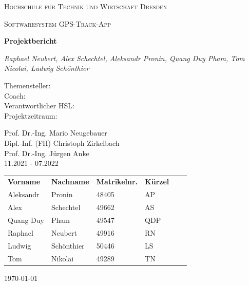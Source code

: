 \documentclass[10pt]{article}
\begin{document}
\begin{titlepage}
    \centering
    {\scshape\LARGE Hochschule für Technik und Wirtschaft Dresden \par}
    \vspace{1cm}
    {\scshape\Large Softwaresystem \glqq GPS-Track-App\grqq\par}
    \vspace{1.5cm}
    {\huge\bfseries Projektbericht\par}
    \vspace{2cm}
    {\Large\itshape Raphael Neubert, Alex Schechtel, Aleksandr Pronin, Quang Duy Pham, Tom Nicolai, Ludwig Schönthier\par}
    \vfill
    \vfill
    \begin{minipage}{0.3\textwidth}
        Themensteller:\\
        Coach:\\
        Verantwortlicher HSL:\\
        Projektzeitraum:
    \end{minipage}
    \begin{minipage}{0.4\textwidth}
        Prof. Dr.-Ing. Mario Neugebauer\\
        Dipl.-Inf. (FH) Christoph Zirkelbach\\
        Prof. Dr.-Ing. Jürgen Anke\\
        11.2021 - 07.2022
    \end{minipage}
    \vfill
\begin{table}[H]
    \begin{tabular}{llllll}
    \textbf{Vorname} & \textbf{Nachname} & \textbf{Matrikelnr.} & \textbf{Kürzel} &  &  \\
    Aleksandr        & Pronin            & 48405                & AP              &  &  \\
    Alex             & Schechtel         & 49662                & AS              &  &  \\
    Quang Duy        & Pham              & 49547                & QDP             &  &  \\
    Raphael          & Neubert           & 49916                & RN              &  &  \\
    Ludwig           & Schönthier        & 50446                & LS              &  &  \\
    Tom              & Nikolai           & 49289                & TN              &  &
    \end{tabular}
    \centering
\end{table}
\vfill

    {\large \today\par}
\end{titlepage}
\tableofcontents
\newpage
{}
\end{document}

